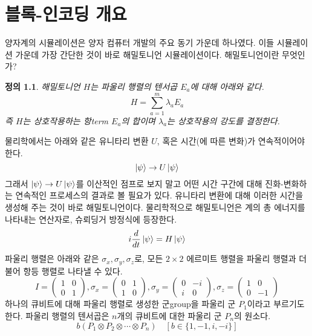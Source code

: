 \documentclass[a4paper,atbegshi,chapter,itemph,]{oblivoir}
\newtheorem{defn}{정의}[chapter]
\begin{document}
\chapter{블록-인코딩 개요}
양자계의 시뮬레이션은 양자 컴퓨터 개발의 주요 \cite{Feynman1982} 동기 가운데
하나였다. 이들 시뮬레이션 가운데 가장 간단한 것이 바로 해밀토니언 시뮬레이션이다.
해밀토니언이란 무엇인가?
\begin{defn}\normalfont
  해밀토니언 $H$는 파울리 행렬의 텐서곱 $E_a$에 대해 아래와 같다.
  \[
    H=\sum_{a=1}^m\lambda_a E_a
  \]
  즉 $H$는 상호작용하는 항{\tiny term} $E_a$의 합이며 $\lambda_a$는 상호작용의
  강도를 결정한다. 
\end{defn}
물리학에서는 아래와 같은 유니타리 변환 $U$, 혹은 시간(에 따른 변화)가 연속적이어야
한다.
\[
  \ket{\psi}\rightarrow U\ket{\psi}
\]
그래서 $\ket{\psi}\rightarrow U\ket{\psi}$를 이산적인 점프로 보지 말고 어떤
시간 구간에 대해 진화-변화하는 연속적인 프로세스의 결과로 볼 필요가 있다. 
유니타리 변환에 대해 이러한 시간을 생성해 주는 것이 바로 해밀토니언이다.
물리학적으로 해밀토니언은 계의 총 에너지를 나타내는 연산자로, 슈뢰딩거 방정식에
등장한다.
\[
  i\frac{d}{dt}\ket{\psi}=H\ket{\psi}
\]
파울리 행렬은 아래와 같은 $\sigma_x,\sigma_y,\sigma_z$로, 모든 $2\times2$
에르미트 행렬을 파울리 행렬과 더불어 항등 행렬로 나타낼 수 있다.
\[
  I=\begin{pmatrix}1&0\\0&1\end{pmatrix},
  \sigma_x=\begin{pmatrix}0&1\\1&0\end{pmatrix},
  \sigma_y=\begin{pmatrix}0&-i\\i&0\end{pmatrix},
  \sigma_z=\begin{pmatrix}1&0\\0&-1\end{pmatrix}
\]
하나의 큐비트에 대해 파울리 행렬로 생성한 군{\tiny group}을 파울리 군 $P_1$이라고
부르기도 한다. 파울리 행렬의 텐서곱은 $n$개의 큐비트에 대한 파울리 군 $P_n$의
원소다.
\[
  b(P_1\otimes P_2\otimes\cdots\otimes P_n)\quad [b\in\{1,-1,i,-i\}]
\]


\end{document}
